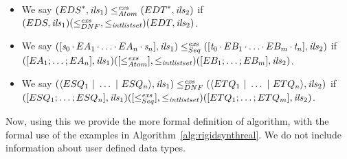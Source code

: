 \documentclass[acmsmall]{acmart}
\begin{document}
\begin{definition}\leavevmode
  \begin{itemize}
  \item We say $({EDS}^*, \mathit{ils}_1) \leq_{Atom}^{\mathit{exs}}
    ({EDT}^*, \mathit{ils}_2)$ if
    $(EDS,\mathit{ils}_1)
    (\leq_{DNF}^{\mathit{exs}},\leq_{\mathit{intlistset}})
    (EDT,\mathit{ils}_2)$.
  \item We say
    $([\mathit{s}_0 \mkern-1mu\cdot\mkern-1mu EA_1 \mkern-1mu\cdot\mkern-1mu \ldots
      \mkern-1mu\cdot\mkern-1mu EA_n \mkern-1mu\cdot\mkern-1mu \mathit{s}_n],\mathit{ils}_1) \leq_{Seq}^{\mathit{exs}}
    ([\mathit{t}_0 \mkern-1mu\cdot\mkern-1mu EB_1 \mkern-1mu\cdot\mkern-1mu \ldots \mkern-1mu\cdot\mkern-1mu
      EB_m \mkern-1mu\cdot\mkern-1mu \mathit{t}_n],\mathit{ils}_2)$ if
    $([ EA_1 ; \ldots ; EA_n ],\mathit{ils}_1)
    ([ \leq_{Atom}^{\mathit{exs}} ],\leq_{\mathit{intlistset}})
    ([ EB_1 ; \ldots ; EB_m ],\mathit{ils}_2)$.
  \item We say
    $(\langle ESQ_1 ~|~ \ldots
      ~|~ ESQ_n\rangle,\mathit{ils}_1) \leq_{DNF}^{\mathit{exs}}
    (\langle ETQ_1 ~|~ \ldots ~|~
      ETQ_n\rangle,\mathit{ils}_2)$ if
    $([ ESQ_1 ; \ldots ; ESQ_n ],\mathit{ils}_1)
    ([ \leq_{Seq}^{\mathit{exs}} ],\leq_{\mathit{intlistset}})
    ([ ETQ_1 ; \ldots ;
      ETQ_m ],\mathit{ils}_2)$.
  \end{itemize}
\end{definition}

Now, using this we provide the more formal definition of algorithm, with the
formal use of the examples in Algorithm~\ref{alg:rigidsynthreal}.  We do not
include information about user defined data types.
\end{document}
